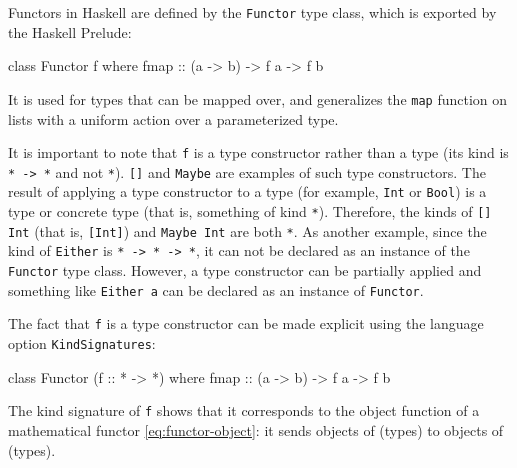 Functors in Haskell are defined by the \texttt{Functor} type class,
which is exported by the Haskell Prelude:
\begin{codehaskell}
  class Functor f where
    fmap :: (a -> b) -> f a -> f b
\end{codehaskell}
It is used for types that can be mapped over, and generalizes the
\texttt{map} function on lists with a uniform action over a
parameterized type.




It is important to note that \texttt{f} is a type constructor rather
than a type (its kind is \texttt{* -> *} and not \texttt{*}).
\texttt{[]} and \texttt{Maybe} are examples of such type constructors.
The result of applying a type constructor to a type (for example,
\texttt{Int} or \texttt{Bool}) is a type or concrete type (that is,
something of kind \texttt{*}). Therefore, the kinds of \texttt{[] Int}
(that is, \texttt{[Int]}) and \texttt{Maybe Int} are both \texttt{*}.
As another example, since the kind of \texttt{Either} is \texttt{* ->
  * -> *}, it can not be declared as an instance of the
\texttt{Functor} type class. However, a type constructor can be
partially applied and something like \texttt{Either a} can be declared
as an instance of \texttt{Functor}.

The fact that \texttt{f} is a type constructor can be made explicit
using the language option \texttt{KindSignatures}:
\begin{codehaskell}
  class Functor (f :: * -> *) where
    fmap :: (a -> b) -> f a -> f b
\end{codehaskell}
The kind signature of \texttt{f} shows that it corresponds to the
object function of a mathematical functor \eqref{eq:functor-object}: it sends
objects of \hask (types) to objects of \hask (types).

